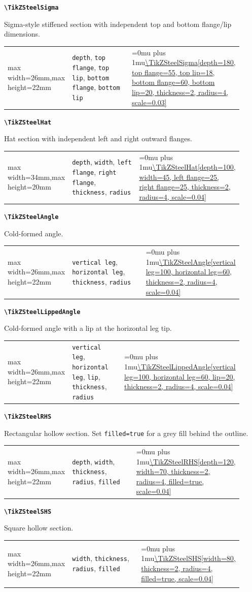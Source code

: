 \documentclass[10pt]{article}
\makeatletter
\newcommand{\command}[1]{\texttt{\textbackslash #1}}
\newcommand{\keyname}[1]{\texttt{#1}}
\newcommand{\CodeInline}[1]{%
  \begingroup
  \ttfamily\scriptsize\raggedright\Urlmuskip=0mu plus 1mu\url{#1}%
  \endgroup
}
\newcommand{\ShapePreview}[1]{%
  \begin{center}
  \begin{adjustbox}{max width=26mm,max height=22mm}
    \begin{tikzpicture}
      #1
    \end{tikzpicture}
  \end{adjustbox}
  \end{center}
}
\newcommand{\WideShapePreview}[1]{%
  \begin{center}
  \begin{adjustbox}{max width=34mm,max height=20mm}
    \begin{tikzpicture}
      #1
    \end{tikzpicture}
  \end{adjustbox}
  \end{center}
}
\newcommand{\ReferenceRow}[6]{%
  \textbf{\command{#1}}\par
  #2\par
  \vspace{2pt}
  \begin{tabular}{@{}p{0.20\linewidth}p{0.34\linewidth}p{0.38\linewidth}@{}}
    #6 & \footnotesize #3 & \CodeInline{#4}
  \end{tabular}
  \par\vspace{4mm}
}
\makeatother
\begin{document}
\ReferenceRow
  {TikZSteelSigma}
  {Sigma-style stiffened section with independent top and bottom flange/lip dimensions.}
  {\keyname{depth}, \keyname{top flange}, \keyname{top lip}, \keyname{bottom flange}, \keyname{bottom lip}}
  {\TikZSteelSigma[depth=180, top flange=55, top lip=18, bottom flange=60, bottom lip=20, thickness=2, radius=4, scale=0.03]}
  {}
  {\ShapePreview{\TikZSteelSigma[depth=180, top flange=55, top lip=18, bottom flange=60, bottom lip=20, thickness=2, radius=4, scale=0.03]}}

\ReferenceRow
  {TikZSteelHat}
  {Hat section with independent left and right outward flanges.}
  {\keyname{depth}, \keyname{width}, \keyname{left flange}, \keyname{right flange}, \keyname{thickness}, \keyname{radius}}
  {\TikZSteelHat[depth=100, width=45, left flange=25, right flange=25, thickness=2, radius=4, scale=0.04]}
  {}
  {\WideShapePreview{\TikZSteelHat[depth=100, width=45, left flange=25, right flange=25, thickness=2, radius=4, scale=0.04]}}

\ReferenceRow
  {TikZSteelAngle}
  {Cold-formed angle.}
  {\keyname{vertical leg}, \keyname{horizontal leg}, \keyname{thickness}, \keyname{radius}}
  {\TikZSteelAngle[vertical leg=100, horizontal leg=60, thickness=2, radius=4, scale=0.04]}
  {}
  {\ShapePreview{\TikZSteelAngle[vertical leg=100, horizontal leg=60, thickness=2, radius=4, scale=0.04]}}

\ReferenceRow
  {TikZSteelLippedAngle}
  {Cold-formed angle with a lip at the horizontal leg tip.}
  {\keyname{vertical leg}, \keyname{horizontal leg}, \keyname{lip}, \keyname{thickness}, \keyname{radius}}
  {\TikZSteelLippedAngle[vertical leg=100, horizontal leg=60, lip=20, thickness=2, radius=4, scale=0.04]}
  {}
  {\ShapePreview{\TikZSteelLippedAngle[vertical leg=100, horizontal leg=60, lip=20, thickness=2, radius=4, scale=0.04]}}

\ReferenceRow
  {TikZSteelRHS}
  {Rectangular hollow section. Set \keyname{filled=true} for a grey fill behind the outline.}
  {\keyname{depth}, \keyname{width}, \keyname{thickness}, \keyname{radius}, \keyname{filled}}
  {\TikZSteelRHS[depth=120, width=70, thickness=2, radius=4, filled=true, scale=0.04]}
  {}
  {\ShapePreview{\TikZSteelRHS[depth=120, width=70, thickness=2, radius=4, filled=true, scale=0.04]}}

\ReferenceRow
  {TikZSteelSHS}
  {Square hollow section.}
  {\keyname{width}, \keyname{thickness}, \keyname{radius}, \keyname{filled}}
  {\TikZSteelSHS[width=80, thickness=2, radius=4, filled=true, scale=0.04]}
  {}
  {\ShapePreview{\TikZSteelSHS[width=80, thickness=2, radius=4, filled=true, scale=0.04]}}
\end{document}
